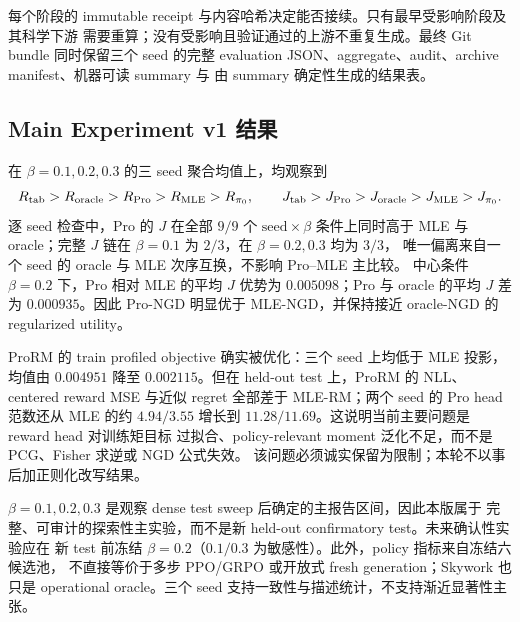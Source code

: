 \documentclass[UTF8,11pt,a4paper,fontset=none]{ctexart}
\begin{document}
每个阶段的 immutable receipt 与内容哈希决定能否接续。只有最早受影响阶段及其科学下游
需要重算；没有受影响且验证通过的上游不重复生成。最终 Git bundle 同时保留三个 seed
的完整 evaluation JSON、aggregate、audit、archive manifest、机器可读 summary 与
由 summary 确定性生成的结果表。

\subsection{Main Experiment v1 结果}


\begin{claimbox}[下游 policy 结论]
在 $\beta=0.1,0.2,0.3$ 的三 seed 聚合均值上，均观察到
\[
R_{\rm tab}>R_{\rm oracle}>R_{\rm Pro}>R_{\rm MLE}>R_{\pi_0},
\qquad
J_{\rm tab}>J_{\rm Pro}>J_{\rm oracle}>J_{\rm MLE}>J_{\pi_0}.
\]
逐 seed 检查中，Pro 的 $J$ 在全部 $9/9$ 个 $\text{seed}\times\beta$ 条件上同时高于
MLE 与 oracle；完整 $J$ 链在 $\beta=0.1$ 为 $2/3$，在 $\beta=0.2,0.3$ 均为 $3/3$，
唯一偏离来自一个 seed 的 oracle 与 MLE 次序互换，不影响 Pro--MLE 主比较。
中心条件 $\beta=0.2$ 下，Pro 相对 MLE 的平均 $J$ 优势为 $0.005098$；Pro 与
oracle 的平均 $J$ 差为 $0.000935$。因此 Pro-NGD 明显优于 MLE-NGD，并保持接近
oracle-NGD 的 regularized utility。
\end{claimbox}

\begin{warnbox}
ProRM 的 train profiled objective 确实被优化：三个 seed 上均低于 MLE 投影，均值由
$0.004951$ 降至 $0.002115$。但在 held-out test 上，ProRM 的 NLL、centered reward
MSE 与近似 regret 全部差于 MLE-RM；两个 seed 的 Pro head 范数还从 MLE 的约
$4.94/3.55$ 增长到 $11.28/11.69$。这说明当前主要问题是 reward head 对训练矩目标
过拟合、policy-relevant moment 泛化不足，而不是 PCG、Fisher 求逆或 NGD 公式失效。
该问题必须诚实保留为限制；本轮不以事后加正则化改写结果。
\end{warnbox}

\begin{warnbox}[证据等级与外部有效性]
$\beta=0.1,0.2,0.3$ 是观察 dense test sweep 后确定的主报告区间，因此本版属于
完整、可审计的探索性主实验，而不是新 held-out confirmatory test。未来确认性实验应在
新 test 前冻结 $\beta=0.2$（$0.1/0.3$ 为敏感性）。此外，policy 指标来自冻结六候选池，
不直接等价于多步 PPO/GRPO 或开放式 fresh generation；Skywork 也只是 operational
oracle。三个 seed 支持一致性与描述统计，不支持渐近显著性主张。
\end{warnbox}
\end{document}
